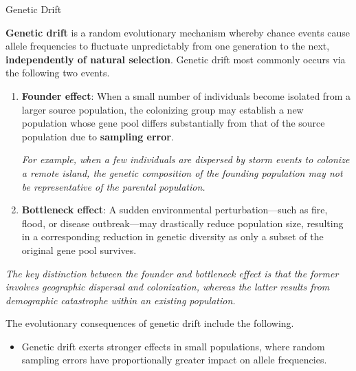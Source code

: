 \documentclass[10pt]{article}
\begin{document}
    \begin{core}{Genetic Drift}

      \textbf{Genetic drift} is a random evolutionary mechanism whereby chance events cause allele frequencies to fluctuate unpredictably from one generation to the next, \textbf{independently of natural selection}. Genetic drift most commonly occurs via the following two events.


      \begin{enumerate}

        \item \textbf{Founder effect}: When a small number of individuals become isolated from a larger source population, the colonizing group may establish a new population whose gene pool differs substantially from that of the source population due to \textbf{sampling error}.

        \textit{For example, when a few individuals are dispersed by storm events to colonize a remote island, the genetic composition of the founding population may not be representative of the parental population.}

        \item \textbf{Bottleneck effect}: A sudden environmental perturbation---such as fire, flood, or disease outbreak---may drastically reduce population size, resulting in a corresponding reduction in genetic diversity as only a subset of the original gene pool survives.


      \end{enumerate}

      \textit{The key distinction between the founder and bottleneck effect is that the former involves geographic dispersal and colonization, whereas the latter results from demographic catastrophe within an existing population.}

      The evolutionary consequences of genetic drift include the following.

      \begin{itemize}

        \item Genetic drift exerts stronger effects in small populations, where random sampling errors have proportionally greater impact on allele frequencies.


\end{itemize}
\end{core}
\end{document}
